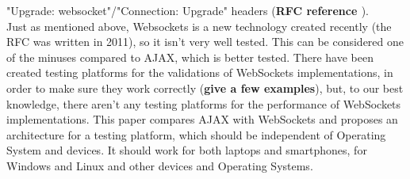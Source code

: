 \documentclass[conference]{IEEEtran}
\begin{document}
"Upgrade: websocket"/"Connection: Upgrade" headers (\textbf{RFC reference \cite{2}}).
\\
\indent
Just as mentioned above, Websockets is a new technology created recently
(the RFC was written in 2011), so it isn't very well tested. This can be
considered one of the minuses compared to AJAX, which is better tested.
There have been created testing platforms for the validations of WebSockets
implementations, in order to make sure they work correctly
(\textbf{give a few examples}), but, to our best knowledge, there aren't any
testing platforms for the performance of WebSockets implementations.
This paper compares AJAX with WebSockets and proposes an architecture for
a testing platform, which should be independent of Operating System and devices.
It should work for both laptops and smartphones, for Windows and Linux and
other devices and Operating Systems.
\end{document}
